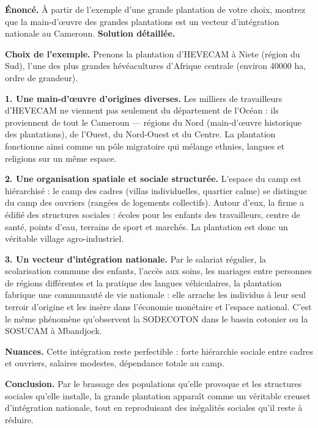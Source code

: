 \documentclass[11pt]{article}
\begin{document}
\begin{exoresolu}
\textbf{Énoncé.} À partir de l'exemple d'une grande plantation de votre choix, montrez que la main-d'œuvre des grandes plantations est un vecteur d'intégration nationale au Cameroun.
\tcblower
\textbf{Solution détaillée.}

\textbf{Choix de l'exemple.} Prenons la plantation d'HEVECAM à Niete (région du Sud), l'une des plus grandes hévéacultures d'Afrique centrale (environ \num{40000} ha, ordre de grandeur).

\textbf{1. Une main-d'œuvre d'origines diverses.} Les milliers de travailleurs d'HEVECAM ne viennent pas seulement du département de l'Océan : ils proviennent de tout le Cameroun — régions du Nord (main-d'œuvre historique des plantations), de l'Ouest, du Nord-Ouest et du Centre. La plantation fonctionne ainsi comme un pôle migratoire qui mélange ethnies, langues et religions sur un même espace.

\textbf{2. Une organisation spatiale et sociale structurée.} L'espace du camp est hiérarchisé : le camp des cadres (villas individuelles, quartier calme) se distingue du camp des ouvriers (rangées de logements collectifs). Autour d'eux, la firme a édifié des structures sociales : écoles pour les enfants des travailleurs, centre de santé, points d'eau, terrains de sport et marchés. La plantation est donc un véritable village agro-industriel.

\textbf{3. Un vecteur d'intégration nationale.} Par le salariat régulier, la scolarisation commune des enfants, l'accès aux soins, les mariages entre personnes de régions différentes et la pratique des langues véhiculaires, la plantation fabrique une communauté de vie nationale : elle arrache les individus à leur seul terroir d'origine et les insère dans l'économie monétaire et l'espace national. C'est le même phénomène qu'observent la SODECOTON dans le bassin cotonier ou la SOSUCAM à Mbandjock.

\textbf{Nuances.} Cette intégration reste perfectible : forte hiérarchie sociale entre cadres et ouvriers, salaires modestes, dépendance totale au camp.

\textbf{Conclusion.} Par le brassage des populations qu'elle provoque et les structures sociales qu'elle installe, la grande plantation apparaît comme un véritable creuset d'intégration nationale, tout en reproduisant des inégalités sociales qu'il reste à réduire.
\end{exoresolu}
\end{document}
